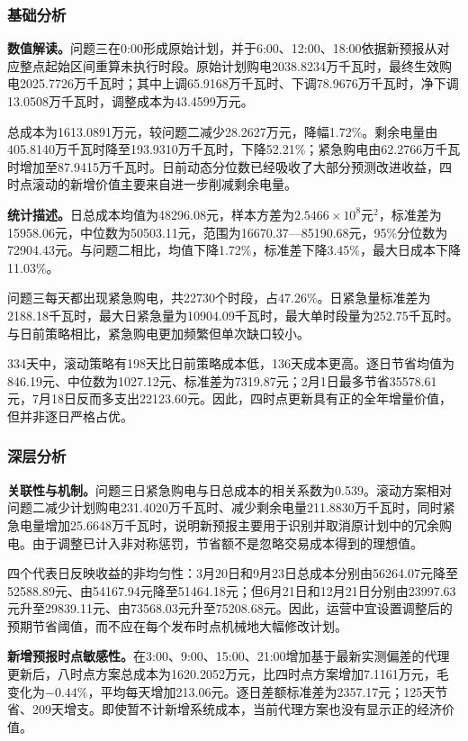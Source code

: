 \documentclass[UTF8,a4paper,12pt,fontset=fandol]{ctexart}
\numberwithin{equation}{section}
\begin{document}
\subsubsection{基础分析}

\textbf{数值解读。}问题三在0:00形成原始计划，并于6:00、12:00、18:00依据新预报从对应整点起始区间重算未执行时段。原始计划购电2038.8234万千瓦时，最终生效购电2025.7726万千瓦时；其中上调65.9168万千瓦时、下调78.9676万千瓦时，净下调13.0508万千瓦时，调整成本为43.4599万元。

总成本为1613.0891万元，较问题二减少28.2627万元，降幅1.72\%。剩余电量由405.8140万千瓦时降至193.9310万千瓦时，下降52.21\%；紧急购电由62.2766万千瓦时增加至87.9415万千瓦时。日前动态分位数已经吸收了大部分预测改进收益，四时点滚动的新增价值主要来自进一步削减剩余电量。

\textbf{统计描述。}日总成本均值为48296.08元，样本方差为$2.5466\times10^8$元$^2$，标准差为15958.06元，中位数为50503.11元，范围为16670.37---85190.68元，95\%分位数为72904.43元。与问题二相比，均值下降1.72\%，标准差下降3.45\%，最大日成本下降11.03\%。

问题三每天都出现紧急购电，共22730个时段，占47.26\%。日紧急量标准差为2188.18千瓦时，最大日紧急量为10904.09千瓦时，最大单时段量为252.75千瓦时。与日前策略相比，紧急购电更加频繁但单次缺口较小。

334天中，滚动策略有198天比日前策略成本低，136天成本更高。逐日节省均值为846.19元、中位数为1027.12元、标准差为7319.87元；2月1日最多节省35578.61元，7月18日反而多支出22123.60元。因此，四时点更新具有正的全年增量价值，但并非逐日严格占优。

\subsubsection{深层分析}

\textbf{关联性与机制。}问题三日紧急购电与日总成本的相关系数为0.539。滚动方案相对问题二减少计划购电231.4020万千瓦时、减少剩余电量211.8830万千瓦时，同时紧急电量增加25.6648万千瓦时，说明新预报主要用于识别并取消原计划中的冗余购电。由于调整已计入非对称惩罚，节省额不是忽略交易成本得到的理想值。

四个代表日反映收益的非均匀性：3月20日和9月23日总成本分别由56264.07元降至52588.89元、由54167.94元降至51464.18元；但6月21日和12月21日分别由23997.63元升至29839.11元、由73568.03元升至75208.68元。因此，运营中宜设置调整后的预期节省阈值，而不应在每个发布时点机械地大幅修改计划。

\textbf{新增预报时点敏感性。}在3:00、9:00、15:00、21:00增加基于最新实测偏差的代理更新后，八时点方案总成本为1620.2052万元，比四时点方案增加7.1161万元，毛变化为$-0.44\%$，平均每天增加213.06元。逐日差额标准差为2357.17元；125天节省、209天增支。即使暂不计新增系统成本，当前代理方案也没有显示正的经济价值。
\end{document}
